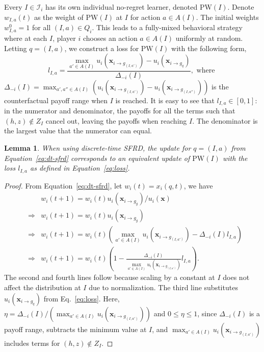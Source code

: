 \documentclass{aamas2014}
\newcommand{\bx}{\mathbf{x}}
\newcommand{\cI}{\mathcal{I}}
\newcommand{\PW}{\mbox{PW}}
\newtheorem{lemma}{Lemma}
\begin{document}
Every $I \in \cI_i$ has its own individual no-regret learner, denoted $\PW(I)$. 
Denote $w_{I,a}(t)$ as the weight of $\PW(I)$ at $I$ for action $a \in A(I)$. 
The initial weights $w^0_{I,a} = 1$ for all $(I,a) \in Q_i$. 
This leads to a fully-mixed behavioral strategy where at each $I$, player $i$ chooses an action 
$a \in A(I)$ uniformly at random.
Letting $q = (I,a)$, we construct a loss for $\PW(I)$ with the following form,
\begin{equation}
\label{eq:loss}
l_{I,a} = \frac{\max_{a' \in A(I)} u_i(\bx_{i \rightarrow g_{(I,a')}}) - u_i(\bx_{i \rightarrow g_q})}{\Delta_{-i}(I)}, \mbox{ where }
\end{equation}
$\Delta_{-i}(I) =  \max_{a', a'' \in A(I)} ( u_i(\bx_{i \rightarrow g_{(I,a')}}) - u_i(\bx_{i \rightarrow g_{(I,a'')}}) )$ 
is the counterfactual payoff range when $I$ is reached. 
It is easy to see that $l_{I,a} \in [0,1]$: in the numerator and denominator, the payoffs for all the terms such that $(h,z) \not\in Z_I$ 
cancel out, leaving the payoffs when reaching $I$. The denominator is the largest value that the numerator can equal. 


\begin{lemma}
When using discrete-time SFRD, the update for $q = (I,a)$ from Equation~\ref{eq:dt-sfrd} corresponds to an equivalent update 
of $\PW(I)$ with the loss $l_{I,a}$ as defined in Equation~\ref{eq:loss}.
\end{lemma}
\begin{proof}
From Equation~\ref{eq:dt-sfrd}, let $w_i(t) = x_i(q,t)$, we have
\begin{eqnarray*}
  &             & w_i(t+1) = w_i(t) u_i(\bx_{i \rightarrow g_g}) / u_i(\bx) \\
  & \Rightarrow & w_i(t+1) = w_i(t) u_i(\bx_{i \rightarrow g_g}) \\
  & \Rightarrow & w_i(t+1) = w_i(t) (\max_{a' \in A(I)} u_i(\bx_{i \rightarrow g_{(I,a')}}) - \Delta_{-i}(I) l_{I,a}) \\   
  & \Rightarrow & w_i(t+1) = w_i(t) (1 - \frac{\Delta_{-i}(I)}{\max_{a' \in A(I)} u_i(\bx_{i \rightarrow g_{(I,a')}})} l_{I,a}).
\end{eqnarray*}
The second and fourth lines follow because scaling by a constant at $I$ does not affect the distribution at $I$ due to normalization.
The third line substitutes $u_i(\bx_{i \rightarrow g_q})$ from Eq.~\ref{eq:loss}. 
Here, $\eta = \Delta_{-i}(I) / ({\max_{a' \in A(I)} u_i(\bx_{i \rightarrow g_{(I,a')}})})$ and $0 \le \eta \le 1$, since $\Delta_{-i}(I)$
is a payoff range, subtracts the minimum value at $I$, 
and ${\max_{a' \in A(I)} u_i(\bx_{i \rightarrow g_{(I,a')}})}$ includes terms for $(h,z) \not\in Z_I$.
\end{proof}
\end{document}
